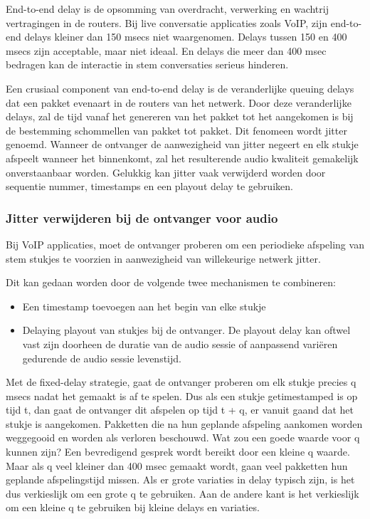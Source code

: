 
End-to-end delay is de opsomming van overdracht, verwerking en wachtrij vertragingen in de routers. Bij live conversatie applicaties zoals VoIP, zijn end-to-end delays kleiner dan 150 msecs niet waargenomen. Delays tussen 150 en 400 msecs zijn acceptable, maar niet ideaal. En delays die meer dan 400 msec bedragen kan de interactie in stem conversaties serieus hinderen.

\clearpage


Een crusiaal component van end-to-end delay is de veranderlijke queuing delays dat een pakket evenaart in de routers van het netwerk. Door deze veranderlijke delays, zal de tijd vanaf het genereren van het pakket tot het aangekomen is bij de bestemming schommellen van pakket tot pakket. Dit fenomeen wordt jitter genoemd. Wanneer de ontvanger de aanwezigheid van jitter negeert en elk stukje afspeelt wanneer het binnenkomt, zal het resulterende audio kwaliteit gemakelijk onverstaanbaar worden. Gelukkig kan jitter vaak verwijderd worden door sequentie nummer, timestamps en een playout delay te gebruiken.

\subsubsection{Jitter verwijderen bij de ontvanger voor audio}

\noindent Bij VoIP applicaties, moet de ontvanger proberen om een periodieke afspeling van stem stukjes te voorzien in aanwezigheid van willekeurige netwerk jitter. 

Dit kan gedaan worden door de volgende twee mechanismen te combineren:
\begin{itemize}
\item Een timestamp toevoegen aan het begin van elke stukje
\item Delaying playout van stukjes bij de ontvanger. De playout delay kan oftwel vast zijn doorheen de duratie van de audio sessie of aanpassend variëren gedurende de audio sessie levenstijd.
\end{itemize}


Met de fixed-delay strategie, gaat de ontvanger proberen om elk stukje precies q msecs nadat het gemaakt is af te spelen. Dus als een stukje getimestamped is op tijd t, dan gaat de ontvanger dit afspelen op tijd t + q, er vanuit gaand dat het stukje is aangekomen. Pakketten die na hun geplande afspeling aankomen worden weggegooid en worden als verloren beschouwd.
Wat zou een goede waarde voor q kunnen zijn? Een bevredigend gesprek wordt bereikt door een kleine q waarde. Maar als q veel kleiner dan 400 msec gemaakt wordt, gaan veel pakketten hun geplande afspelingstijd missen. Als er grote variaties in delay typisch zijn, is het dus verkieslijk om een grote q te gebruiken. Aan de andere kant is het verkieslijk om een kleine q te gebruiken bij kleine delays en variaties.

